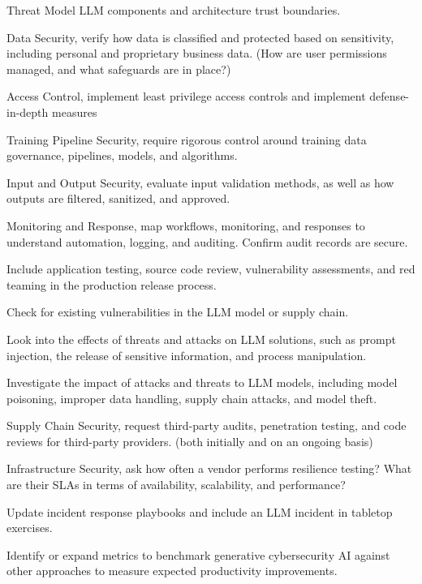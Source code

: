 \begin{minipage}{\linewidth}
\begin{checklist}
  \item Threat Model LLM components and architecture trust boundaries.
  \item Data Security, verify how data is classified and protected based on sensitivity, including personal and proprietary business data. (How are user permissions managed, and what safeguards are in place?)
  \item Access Control, implement least privilege access controls and implement defense-in-depth measures
  \item Training Pipeline Security, require rigorous control around training data governance, pipelines, models, and algorithms.
  \item Input and Output Security, evaluate input validation methods, as well as how outputs are filtered, sanitized, and approved.
  \item Monitoring and Response, map workflows, monitoring, and responses to understand automation, logging, and auditing. Confirm audit records are secure.
  \item Include application testing, source code review, vulnerability assessments, and red teaming in the production release process.
  \item Check for existing vulnerabilities in the LLM model or supply chain.
  \item Look into the effects of threats and attacks on LLM solutions, such as prompt injection, the release of sensitive information, and process manipulation.
  \item Investigate the impact of attacks and threats to LLM models, including model poisoning, improper data handling, supply chain attacks, and model theft.
  \item Supply Chain Security, request third-party audits, penetration testing, and code reviews for third-party providers. (both initially and on an ongoing basis)
  \item Infrastructure Security, ask how often a vendor performs resilience testing? What are their SLAs in terms of availability, scalability, and performance?
  \item Update incident response playbooks and include an LLM incident in tabletop exercises.
  \item Identify or expand metrics to benchmark generative cybersecurity AI against other approaches to measure expected productivity improvements.
\end{checklist}
\end{minipage}

